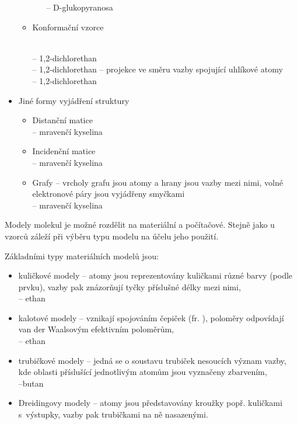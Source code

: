 \begin{itemize}
\begin{itemize}
\begin{itemize}
									 -- D-glukopyranosa
					  \end{itemize}
				\item Konformační vzorce
					  \begin{itemize}
							 \\
										-- 1,2-dichlorethan
							 \\
										-- 1,2-dichlorethan
							 -- projekce ve směru vazby
									spojující uhlíkové atomy \\
										-- 1,2-dichlorethan
					  \end{itemize}
		  \end{itemize}
	\item Jiné formy vyjádření struktury
		  \begin{itemize}
				\item Distanční matice \\
					   -- mravenčí kyselina
				\item Incidenční matice \\
					   -- mravenčí kyselina
				\item Grafy -- vrcholy grafu jsou atomy a hrany jsou vazby mezi
					  nimi, volné elektronové páry jsou vyjádřeny smyčkami \\
					   -- mravenčí kyselina
		  \end{itemize}
\end{itemize}

Modely molekul je možné rozdělit na materiální a počítačové. Stejně jako u
vzorců záleží při výběru typu modelu na účelu jeho použití.

Základními typy materiálních modelů jsou:
\begin{itemize}
	\item kuličkové modely -- atomy jsou reprezentovány kuličkami různé barvy
		  (podle prvku), vazby pak znázorňují tyčky příslušné délky mezi nimi, \\
		   -- ethan
	\item kalotové modely -- vznikají spojováním čepiček (fr. ),
		  poloměry odpovídají van der Waalsovým efektivním poloměrům, \\
		   -- ethan
	\item trubičkové modely -- jedná se o soustavu trubiček nesoucích význam
		  vazby, kde oblasti příslušící jednotlivým atomům jsou vyznačeny
		  zbarvením, \\
		   --butan
	\item Dreidingovy modely -- atomy jsou představovány kroužky popř. ku\-lič\-ka\-mi
		  s~výstupky, vazby pak trubičkami na ně nasazenými. \\
\end{itemize}

